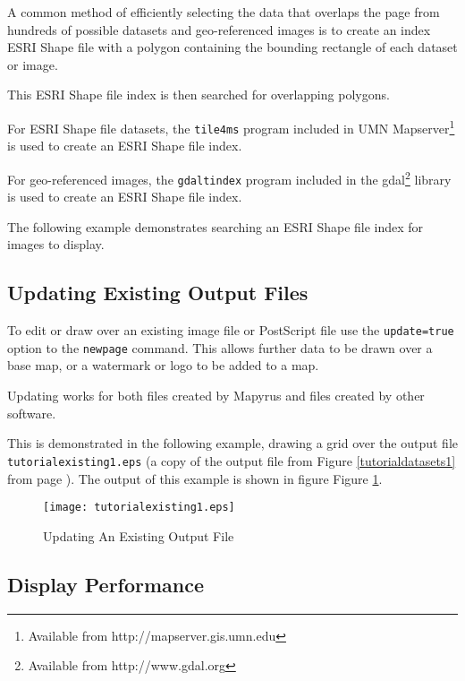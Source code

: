 

A common method of efficiently selecting the data that overlaps the page from
hundreds of possible datasets and geo-referenced images is to create an index
ESRI Shape file with a polygon containing the bounding rectangle of each
dataset or image.

This ESRI Shape file index is then searched for overlapping polygons.

For ESRI Shape file datasets, the \texttt{tile4ms} program included in 
UMN Mapserver\footnote{Available from http://mapserver.gis.umn.edu} is used
to create an ESRI Shape file index.

For geo-referenced images, the
\texttt{gdaltindex} program included in the gdal\footnote{Available
from http://www.gdal.org} library is used to create an ESRI Shape file index.

The following example demonstrates searching an ESRI Shape file index
for images to display.



\subsection{Updating Existing Output Files}

To edit or draw over an existing image file or PostScript file use
the \texttt{update=true} option to the \texttt{newpage} command.
This allows further data to be drawn over a base map, or a watermark
or logo to be added to a map.

Updating works for both files created by Mapyrus and files created
by other software.

This is demonstrated in the following example, drawing a grid over
the output file \texttt{tutorialexisting1.eps} (a copy of the output file
from Figure \ref{tutorialdatasets1} from page \pageref{tutorialdatasets1}).
The output of this example is shown in figure
Figure \ref{tutorialexisting1}.



\begin{figure}[htb]
\texttt{[image: tutorialexisting1.eps]}
\caption{Updating An Existing Output File}
\label{tutorialexisting1}
\end{figure}

\subsection{Display Performance}

